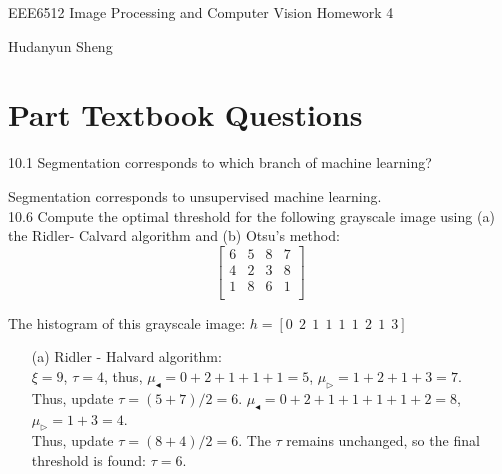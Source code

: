\documentclass[a4paper]{article}
\begin{document}
\begin{spacing}{2.0}
\begin{flushleft}\begin{huge}EEE6512 Image Processing and Computer Vision   Homework 4\end{huge}\end{flushleft}
\begin{flushright}\begin{Large} Hudanyun Sheng \end{Large}\end{flushright}

\section*{\huge\textbf{ Part \uppercase\expandafter{} Textbook Questions}  }
	\normalsize
	\noindent
	
	10.1 Segmentation corresponds to which branch of machine learning?

	Segmentation corresponds to unsupervised machine learning.\\
	

	10.6 Compute the optimal threshold for the following grayscale image using (a) the Ridler- Calvard algorithm and (b) Otsu's method:
	$$\begin{bmatrix}
	6 & 5 & 8 & 7\\
	4 & 2 & 3 & 8\\
	1 & 8 & 6 & 1\\
	\end{bmatrix}$$ 
	
	The histogram of this grayscale image: $h = [0 \ \ 2 \ \ 1 \ \ 1 \ \ 1 \ \ 1 \ \ 2 \ \ 1 \  \ 3]$
	\begin{enumerate}
	\item[(a)] Ridler - Halvard algorithm: \\
	$\xi = 9$, $\tau = 4$, thus, $\mu_{\blacktriangleleft} = 0+2+1+1+1 = 5$, $\mu_{\vartriangleright} = 1+2+1+3 = 7$.\\
	Thus, update $\tau = (5+7)/2 = 6$. $\mu_{\blacktriangleleft} = 0+2+1+1+1+1 +2  = 8$, $\mu_{\vartriangleright} = 1+3 = 4$.\\
	Thus, update $\tau = (8+4)/2 = 6$. The $\tau$ remains unchanged, so the final threshold is found: $\tau = 6$.
	

\end{enumerate}
\end{spacing}
\end{document}
